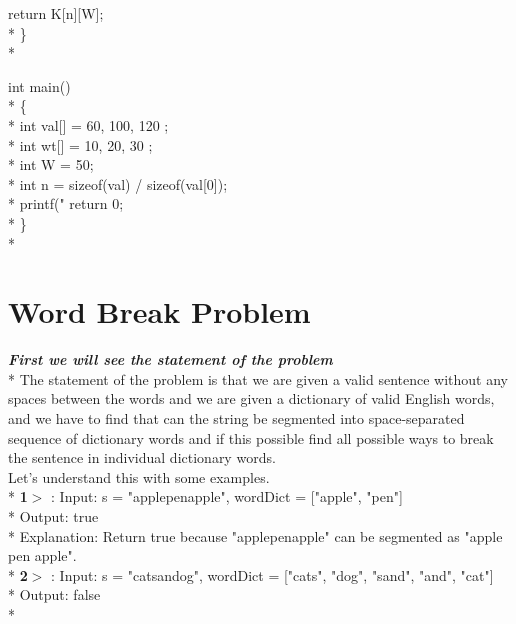 \documentclass[12pt]{book}
\begin{document}
\phantom{x} \hspace{3ex}\phantom{x} \hspace{3ex}    return K[n][W]; \\*
\} \\*

int main() \\*
\{ \\*
\phantom{x} \hspace{3ex}    int val[] = { 60, 100, 120 }; \\*
\phantom{x} \hspace{3ex}    int wt[] = { 10, 20, 30 }; \\*
\phantom{x} \hspace{3ex}    int W = 50; \\*
\phantom{x} \hspace{3ex}    int n = sizeof(val) / sizeof(val[0]); \\*
\phantom{x} \hspace{3ex}    printf("%
\phantom{x} \hspace{3ex}    return 0; \\*
\}\\*
\chapter{Word Break Problem}
\textbf{\textit{First we will see the statement of the problem}}\\*
\newline
The statement of the problem is that we are given a valid sentence without any spaces between the words and we are given a dictionary of valid English words, and we have to find that can the string be segmented into space-separated sequence of dictionary words and if this possible find all possible ways to break the sentence in individual dictionary words.\\
\newline
Let’s understand this with some examples.\\*
\textbf{1$>$} : Input: s = "applepenapple", wordDict = ["apple", "pen"] \\*
  Output: true \\*
  Explanation: Return true because "applepenapple" can be segmented as "apple 
  pen apple".\\*
\textbf{2$>$} : Input: s = "catsandog", wordDict = ["cats", "dog", "sand", "and", "cat"] \\*
 Output: false\\*
 
\end{document}
